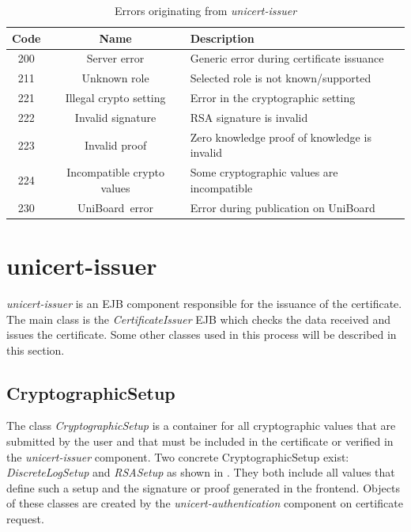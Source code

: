 \documentclass[oneside]{scrreprt}
\newcommand{\uniboard}{\mbox{UniBoard}}
\begin{document}
\begin{table}[ht]
\centering
\begin{tabular}{|c|c|l|}
  \hline
  Code & Name & Description\\
  \hline
  200 & Server error & Generic error during certificate issuance\\
  211 & Unknown role & Selected role is not known/supported\\
  221 & Illegal crypto setting & Error in the cryptographic setting\\
  222 & Invalid signature &  RSA signature is invalid\\
  223 & Invalid proof & Zero knowledge proof of knowledge is invalid\\
  224 & Incompatible crypto values & Some cryptographic values are incompatible\\
  230 & \uniboard\ error & Error during publication on \uniboard\\
  \hline
\end{tabular}
\caption{Errors originating from \textit{unicert-issuer}}
\label{t:errorCodes2}
\end{table}

\section{unicert-issuer}

\textit{unicert-issuer} is an EJB component responsible for the issuance of the certificate. The main class is the \textit{CertificateIssuer} EJB which checks the data received and issues the certificate. Some other classes used in this process will be described in this section.

\subsection{CryptographicSetup}

The class \textit{CryptographicSetup} is a container for all cryptographic values that are submitted by the user and that must be included in the certificate or verified in the \textit{unicert-issuer} component. Two concrete CryptographicSetup exist: \textit{DiscreteLogSetup} and \textit{RSASetup} as shown in . They both include all values that define such a setup and the signature or proof generated in the frontend. Objects of these classes are created by the \textit{unicert-authentication} component on certificate request.
\end{document}
